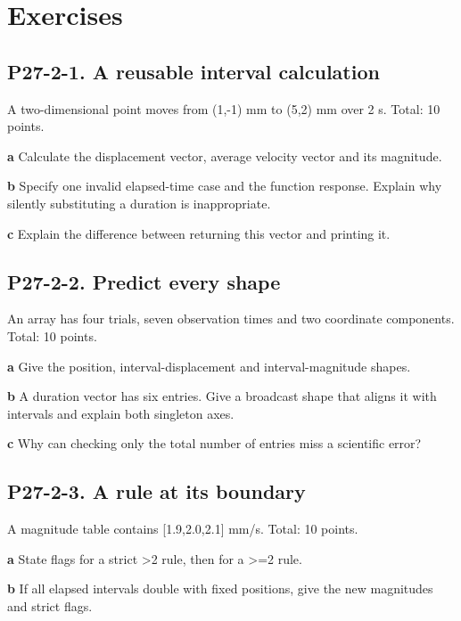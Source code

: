 \documentclass[11pt,letterpaper]{article}
\theoremstyle{definition}\newtheorem{definition}{Definition}\newtheorem{example}{Example}
\numberwithin{equation}{section}
\begin{document}
\section*{Exercises}
\par\noindent\begin{minipage}{\linewidth}
\subsection*{P27-2-1. A reusable interval calculation}
A two-dimensional point moves from (1,-1) mm to (5,2) mm over 2 s. Total: 10 points.

\textbf{a} Calculate the displacement vector, average velocity vector and its magnitude.

\end{minipage}\par\medskip
\textbf{b} Specify one invalid elapsed-time case and the function response. Explain why silently substituting a duration is inappropriate.

\textbf{c} Explain the difference between returning this vector and printing it.

\par\noindent\begin{minipage}{\linewidth}
\subsection*{P27-2-2. Predict every shape}
An array has four trials, seven observation times and two coordinate components. Total: 10 points.

\textbf{a} Give the position, interval-displacement and interval-magnitude shapes.

\end{minipage}\par\medskip
\textbf{b} A duration vector has six entries. Give a broadcast shape that aligns it with intervals and explain both singleton axes.

\textbf{c} Why can checking only the total number of entries miss a scientific error?

\par\noindent\begin{minipage}{\linewidth}
\subsection*{P27-2-3. A rule at its boundary}
A magnitude table contains [1.9,2.0,2.1] mm/s. Total: 10 points.

\textbf{a} State flags for a strict >2 rule, then for a >=\allowbreak{}2 rule.

\end{minipage}\par\medskip
\textbf{b} If all elapsed intervals double with fixed positions, give the new magnitudes and strict flags.
\end{document}
